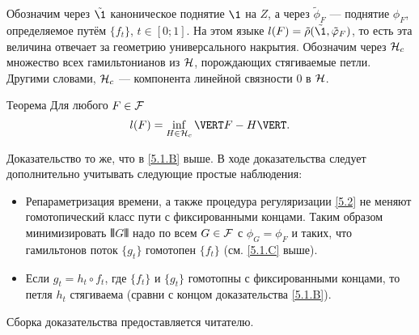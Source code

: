 Обозначим через $\tilde\1$ каноническое поднятие $\1$ на $Z$, а через $\tilde\phi_F$ --- поднятие $\phi_F$, определяемое путём $\{f_t\}$, $t \in [0; 1]$.
На этом языке $l (F) = \tilde\rho (\tilde\1, \tilde\phi_F)$, то есть эта величина отвечает за геометрию универсального накрытия.
Обозначим через $\mathcal{H}_c$ множество всех гамильтонианов из $\mathcal{H}$, порождающих стягиваемые петли.
Другими словами, $\mathcal{H}_c$ --- компонента линейной связности $0$ в $\mathcal{H}$.

\begin{thm}{Теорема}\label{5.3.A}
Для любого $F \in \mathcal{F}$ 
\[l (F) = \inf_{H\in\H_c} \VERT F - H \VERT.\]
\end{thm}

Доказательство то же, что в \ref{5.1.B} выше.
В ходе доказательства следует дополнительно учитывать следующие простые наблюдения:
\begin{itemize}
\item Репараметризация времени, а также процедура регуляризации \ref{5.2} не меняют гомотопический класс пути с фиксированными концами.
Таким образом минимизировать $\VERT G \VERT$ надо по всем $G \in \mathcal{F}$ с $\phi_G = \phi_F$ и таких, что гамильтонов поток $\{g_t\}$ гомотопен $\{f_t\}$ (см. \ref{5.1.C} выше).
\item Если $g_t = h_t \circ f_t$, где $\{f_t\}$ и $\{g_t\}$ гомотопны с фиксированными концами, то петля $h_t$ стягиваема (сравни с концом доказательства \ref{5.1.B}).
\end{itemize}
Сборка доказательства предоставляется читателю.
